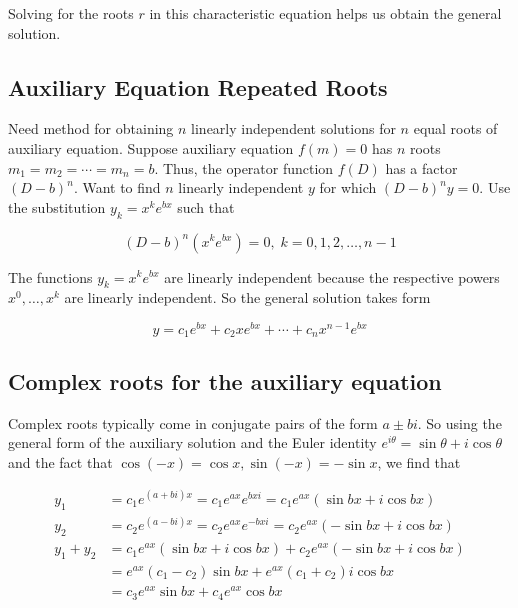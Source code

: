 Solving for the roots $r$ in this characteristic equation helps us obtain the general solution.

\subsection{Auxiliary Equation Repeated Roots}

Need method for obtaining $n$ linearly independent solutions for $n$ equal roots of auxiliary equation.
Suppose auxiliary equation $f(m)=0$ has $n$ roots $m_1=m_2=\cdots=m_n=b$.
Thus, the operator function $f(D)$ has a factor $(D-b)^n$. Want to find $n$ linearly independent $y$ for which $(D-b)^ny=0$.
Use the substitution $y_k=x^ke^{bx}$ such that

\begin{equation}
    (D-b)^n(x^ke^{bx})=0,\;k=0,1,2,\ldots,n-1
\end{equation}

The functions $y_k=x^ke^{bx}$ are linearly independent because the respective powers $x^0,\ldots,x^k$ are linearly independent.
So the general solution takes form

\begin{equation}
    y=c_1e^{bx}+c_2xe^{bx}+\cdots+c_nx^{n-1}e^{bx}
\end{equation}

\subsection{Complex roots for the auxiliary equation}

Complex roots typically come in conjugate pairs of the form $a\pm bi$.
So using the general form of the auxiliary solution and the Euler identity $e^{i\theta}=\sin\theta + i\cos\theta$ and the fact that $\cos(-x)=\cos x, \sin(-x)=-\sin x$, we find that

\begin{align}
    y_1&=c_1e^{(a+bi)x}=c_1e^{ax}e^{bxi}=c_1e^{ax}\left(\sin bx + i\cos bx\right)\\
    y_2&=c_2e^{(a-bi)x}=c_2e^{ax}e^{-bxi}=c_2e^{ax}\left(-\sin bx + i\cos bx\right)\\
    y_1+y_2&=c_1e^{ax}\left(\sin bx + i\cos bx\right)+c_2e^{ax}\left(-\sin bx + i\cos bx\right)\\
    &=e^{ax}(c_1-c_2)\sin bx + e^{ax}(c_1+c_2)i\cos bx\\
    &=c_3e^{ax}\sin bx + c_4e^{ax}\cos bx
\end{align}

